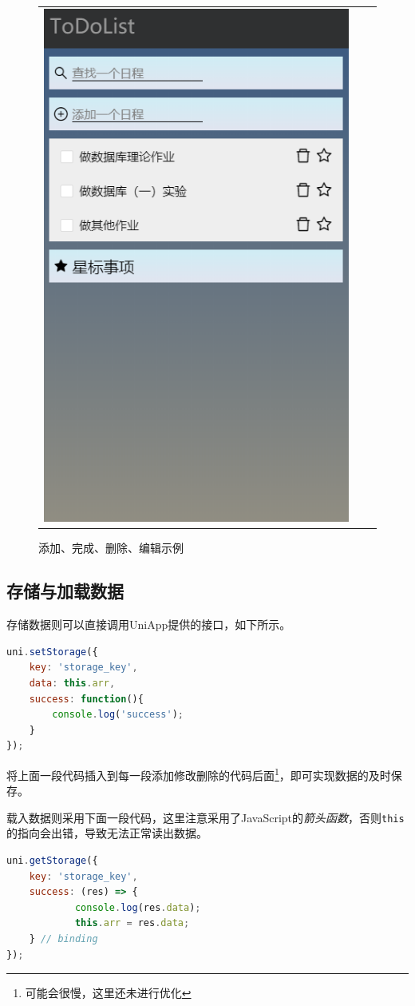 \documentclass[logo,reportComp]{thesis}
\begin{document}
\begin{figure}[H]
\begin{tabular}{ccc}
\includegraphics[width=0.4\linewidth]{fig/modify.png}
\end{tabular}
\caption{添加、完成、删除、编辑示例}
\label{fig:add}
\end{figure}

\subsection{存储与加载数据}
存储数据则可以直接调用UniApp提供的接口，如下所示。
\begin{lstlisting}[language=JavaScript]
uni.setStorage({
	key: 'storage_key',
	data: this.arr,
	success: function(){
		console.log('success');
	}
});
\end{lstlisting}

将上面一段代码插入到每一段添加修改删除的代码后面\footnote{可能会很慢，这里还未进行优化}，即可实现数据的及时保存。

载入数据则采用下面一段代码，这里注意采用了JavaScript的\emph{箭头函数}，否则\verb'this'的指向会出错，导致无法正常读出数据。
\begin{lstlisting}[language=JavaScript]
uni.getStorage({
	key: 'storage_key',
	success: (res) => {
			console.log(res.data);
			this.arr = res.data;
	} // binding
});
\end{lstlisting}
\end{document}
